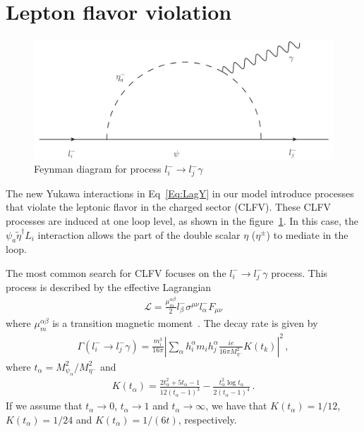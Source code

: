 \documentclass[12pt]{article}
\begin{document}
\section{Lepton flavor violation}
\label{sec:LFV}
%
\begin{figure}
\centering
\includegraphics[scale=0.6]{Figures/LFV.pdf}
\caption{Feynman diagram for process $l^{-}_{i} \to l^{-}_{j} \gamma$}
\label{fig:LFV}
\end{figure}
%
The new Yukawa interactions in Eq~\eqref{Eq:LagY} in our model introduce processes that violate the leptonic flavor in the charged sector (CLFV). These CLFV processes are induced at one loop level, as shown in the figure~\ref{fig:LFV}. In this case, the $\psi_{a} \widetilde{\eta}^{\dagger} L_{i}$ interaction allows the part of the double scalar $\eta$ ($\eta^{\pm}$) to mediate in the loop.

The most common search for CLFV focuses on the $l^{-}_{i} \to l^{-}_{j} \gamma$ process. This process is described by the effective Lagrangian
%
\begin{align}
    \mathcal{L} = \frac{\mu_{m}^{\alpha \beta}}{2} l^{-}_{\beta} \sigma^{\mu \nu} l^{-}_{\alpha} F_{\mu \nu}
\end{align}
%
where $\mu_{m}^{\alpha \beta}$ is a transition magnetic moment~\cite{Toma:2013zsa}.
The decay rate is given by~\cite{Lavoura:2003xp}
%
\begin{align}
 \Gamma(l^{-}_{i} \to l^{-}_{j} \gamma) = \frac{m^{3}_{i}}{16 \pi} \left| \sum_{\alpha} h^{\alpha}_{i} m_{i} h^{\alpha}_{j} \frac{i e}{16 \pi M^{2}_{\eta^{-}}} K(t_{k}) \right|^{2}\,, 
\end{align}
%
where $t_{\alpha} = M^{2}_{\psi_{\alpha}}/M^{2}_{\eta^{-}}$ and
%
\begin{align}
    K(t_{\alpha}) = \frac{2t_{\alpha}^{2}+5t_{\alpha}-1}{12(t_{\alpha}-1)^{3}} - \frac{t_{\alpha}^{2}\log t_{\alpha}}{2(t_{\alpha}-1)^{4}}\,.
\end{align}
%
If we assume that $t_{\alpha} \to 0$, $t_{\alpha} \to 1$ and $t_{\alpha} \to \infty$, we have that $K(t_{\alpha}) = 1/12$, $K(t_{\alpha}) = 1/24$ and $K(t_{\alpha}) = 1/(6t)$, respectively.
\end{document}
